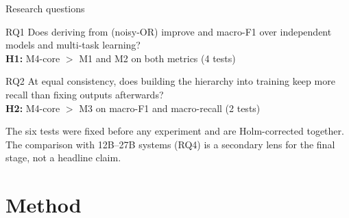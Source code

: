 \begin{frame}{Research questions}
\begin{block}{RQ1}
Does deriving \DET{} from \TYPE{} (noisy-OR) improve \DET{} and \TYPE{}
macro-F1 over independent models and multi-task learning?\\[2pt]
\small\textbf{H1:} M4-core $>$ M1 and M2 on both metrics \hfill (4 tests)
\end{block}
\begin{block}{RQ2}
At equal consistency, does building the hierarchy into training keep more
\TYPE{} recall than fixing outputs afterwards?\\[2pt]
\small\textbf{H2:} M4-core $>$ M3 on \TYPE{} macro-F1 and macro-recall \hfill (2 tests)
\end{block}
\vspace{2pt}
\small The six tests were fixed before any experiment and are Holm-corrected together.\\
\footnotesize The comparison with 12B--27B systems (RQ4) is a secondary lens for the final stage, not a headline claim.
\end{frame}

\section{Method}

